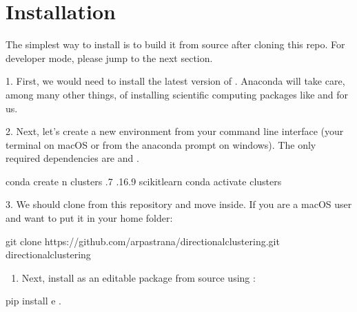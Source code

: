 \documentclass[letterpaper,10pt,english]{sphinxmanual}
\begin{document}
\section{Installation}
\label{\detokenize{gettingstarted:installation}}
The simplest way to install  is to build it from source
after cloning this repo. For developer mode, please jump to the next section.

1. First, we would need to install the latest version of
. Anaconda will take care, among many other
things, of installing scientific computing packages like  and
 for us.

2. Next, let’s create a new  environment from your command line interface
(your terminal on macOS or from the anaconda prompt on windows).
The only required dependencies are  and .

\begin{sphinxVerbatim}[commandchars=\\\{\}]
conda create \PYGZhy{}n clusters .7 .16.9 scikit\PYGZhy{}learn
conda activate clusters
\end{sphinxVerbatim}

3. We should clone  from this repository and move inside.
If you are a macOS user and want to put it in your home folder:

\begin{sphinxVerbatim}[commandchars=\\\{\}]
 \PYGZti{}
git clone https://github.com/arpastrana/directional\PYGZus{}clustering.git
 directional\PYGZus{}clustering
\end{sphinxVerbatim}
\begin{enumerate}
%
\setcounter{enumi}{3}
\item {} 
Next, install  as an editable package from source using :

\end{enumerate}

\begin{sphinxVerbatim}[commandchars=\\\{\}]
pip install \PYGZhy{}e .
\end{sphinxVerbatim}
\end{document}
